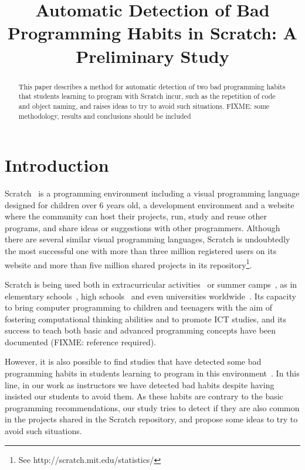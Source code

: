 \documentclass[conference]{format/IEEEtran}
\title{Automatic Detection of Bad Programming Habits in Scratch: A Preliminary Study}
\author{\IEEEauthorblockN{Jesús Moreno}
\IEEEauthorblockA{INTEF \& Programamos.es\\
Madrid, Spain\\
j.morenol@gmail.com}
\and
\IEEEauthorblockN{Gregorio Robles}
\IEEEauthorblockA{GSyC/LibreSoft\\Universidad Rey Juan Carlos\\
Madrid, Spain\\
grex@gsyc.urjc.es}}
\begin{document}
\maketitle

\begin{abstract}
This paper describes a method for automatic detection of two bad programming habits that students learning to program with Scratch incur, such as the repetition of code and object naming, and raises ideas to try to avoid such situations. FIXME: some methodology, results and conclusions should be included

\end{abstract}

\section{Introduction}

Scratch~\cite{resnick2009scratch}  is a programming environment including a visual programming language designed for children over 6 years old, a development environment and a website where the community can host their projects, run, study and reuse other programs, and share ideas or suggestions with other programmers. Although there are several similar visual programming languages, Scratch is undoubtedly the most successful one with more than three million registered users on its website and more than five million shared projects in its repository\footnote{See http://scratch.mit.edu/statistics/}.

Scratch is being used both in extracurricular activities~\cite{maloney2008programming, kafai2010entering} or summer camps~\cite{adams2010scratching, franklin2013assessment}, as in elementary schools~\cite{wilson2012evaluation}, high schools~\cite{meerbaum2013learning} and even universities worldwide~\cite{wolz2009starting, malan2007scratch}. Its capacity to bring computer programming to children and teenagers with the aim of fostering computational thinking abilities and to promote ICT studies, and its success to teach both basic and advanced programming concepts have been documented (FIXME: reference required).

However, it is also possible to find studies that have detected some bad programming habits in students learning to program in this environment~\cite{meerbaum2011habits}. In this line, in our work as instructors we have detected bad habits despite having insisted our students to avoid them. As these habits are contrary to the basic programming recommendations, our study tries to detect if they are also common in the projects shared in the Scratch repository, and propose some ideas to try to avoid such situations.
\end{document}
